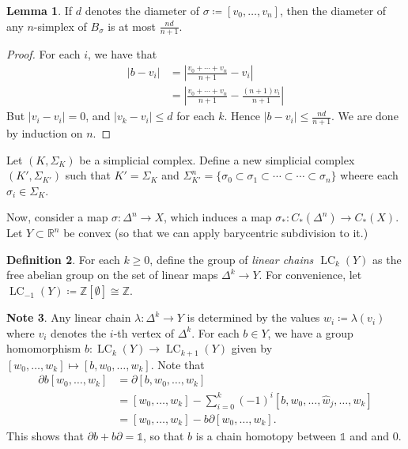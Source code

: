 \documentclass[10pt,letterpaper,cm]{nupset}
\theoremstyle{definition}
\newtheorem{definition}{Definition}[subsection]
\newtheorem{note}[definition]{Note}
\theoremstyle{theorem}
\newtheorem{lemma}[definition]{Lemma}
\theoremstyle{remark}
\newcommand{\R}{\mathbb{R}}
\newcommand{\Z}{\mathbb Z}
\newcommand{\1}{\mathbb{1}}
\newcommand{\0}{\vec 0}
\DeclareMathOperator{\lc}{\mathrm{LC}}
\begin{document}
\begin{lemma}
If $d$ denotes the diameter of $\sigma\coloneqq  [v_0, \ldots, v_n]$, then the diameter of any $n$-simplex of $B_{\sigma}$ is at most $\frac{nd}{n+1}$.
\end{lemma}
\begin{proof}
For each $i$, we have that
\begin{align*} \left\lvert{b - v_i}\right\rvert & = \left\lvert{\frac{v_0 + \cdots + v_n}{n+1} - v_i}\right\rvert
\\ & = \left\lvert{\frac{v_0 + \cdots + v_n}{n+1} - \frac{(n+1)v_i}{n+1}}\right\rvert
\end{align*}
But $\left\lvert{v_i - v_i}\right\rvert=0$, and $\left\lvert{v_k - v_i}\right\rvert \leq d$ for each $k$. Hence $ \left\lvert{b - v_i}\right\rvert \leq \frac{nd}{n+1}$. We are done by induction on $n$.
\end{proof}


Let $\left(K, \Sigma_K\right)$ be a simplicial complex. Define a new simplicial complex $\left(K' , \Sigma_{K'}\right)$ such that $K' = \Sigma_K$ and $\Sigma^n_{K'} = \{\sigma_0 \subset \sigma_1 \subset \cdots \subset \cdots \subset \sigma_n\}$ wheere each $\sigma_i \in \Sigma_K$.

\medskip

Now, consider a map $\sigma : \Delta^n \to X$, which induces a map $\sigma_{\ast}: C_{\ast}(\Delta^n) \to C_{\ast}(X)$. Let $Y \subset \R^n$ be convex (so that we can apply barycentric subdivision to it.) 

\begin{definition}
For each $k\geq 0$, define the group of \textit{linear chains $\lc_k(Y)$} as the free abelian group on the set of linear maps $\Delta^k \to Y$.  For convenience, let $\lc_{-1}(Y)\coloneqq  \Z\left[\emptyset\right] \cong \Z$.
\end{definition}

\begin{note}
Any linear chain $\lambda: \Delta^k \to Y$ is determined by the values $w_i \coloneqq  \lambda(v_i)$ where $v_i$ denotes the $i$-th vertex of $\Delta^k$. For each $b\in Y$, we have a group homomorphism $b: \lc_k(Y) \to \lc_{k+1}(Y)$ given by $[w_0, \ldots, w_k] \mapsto [b, w_0, \ldots, w_k]$. Note that 
\begin{align*} \partial{b[w_0, \ldots, w_k]} & =  \partial{[b, w_0, \ldots, w_k]}
\\ & = [w_0, \ldots, w_k] - \sum_{i=0}^k ({-1})^i[b, w_0, \ldots, \hat{w}_j, \ldots, w_k]
\\ & = [w_0, \ldots, w_k] - b{\partial{[w_0, \ldots, w_k]}}.
\end{align*}
This shows that $\partial{b} + b{\partial} =\1$, so that $b$ is a chain homotopy between $\1$ and and $0$.
\end{note}
\end{document}
